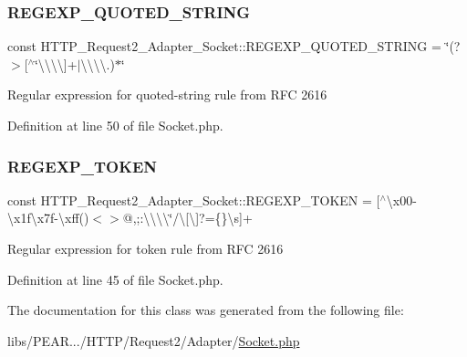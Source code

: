\subsubsection{\texorpdfstring{R\+E\+G\+E\+X\+P\+\_\+\+Q\+U\+O\+T\+E\+D\+\_\+\+S\+T\+R\+I\+NG}{REGEXP\_QUOTED\_STRING}}
{\footnotesize\ttfamily const H\+T\+T\+P\+\_\+\+Request2\+\_\+\+Adapter\+\_\+\+Socket\+::\+R\+E\+G\+E\+X\+P\+\_\+\+Q\+U\+O\+T\+E\+D\+\_\+\+S\+T\+R\+I\+NG = \textquotesingle{}\char`\"{}(?$>$\mbox{[}$^\wedge$\char`\"{}\textbackslash{}\textbackslash{}\textbackslash{}\textbackslash{}\mbox{]}+$\vert$\textbackslash{}\textbackslash{}\textbackslash{}\textbackslash{}.)$\ast$\char`\"{}\textquotesingle{}}

Regular expression for \textquotesingle{}quoted-\/string\textquotesingle{} rule from R\+FC 2616 

Definition at line 50 of file Socket.\+php.

\mbox{\label{classHTTP__Request2__Adapter__Socket_a56beacc9218c6048c7f9ad5af80959eb}} 
\subsubsection{\texorpdfstring{R\+E\+G\+E\+X\+P\+\_\+\+T\+O\+K\+EN}{REGEXP\_TOKEN}}
{\footnotesize\ttfamily const H\+T\+T\+P\+\_\+\+Request2\+\_\+\+Adapter\+\_\+\+Socket\+::\+R\+E\+G\+E\+X\+P\+\_\+\+T\+O\+K\+EN = \textquotesingle{}\mbox{[}$^\wedge$\textbackslash{}x00-\/\textbackslash{}x1f\textbackslash{}x7f-\/\textbackslash{}xff()$<$$>$@,;\+:\textbackslash{}\textbackslash{}\textbackslash{}\textbackslash{}\char`\"{}/\textbackslash{}\mbox{[}\textbackslash{}\mbox{]}?=\{\}\textbackslash{}s\mbox{]}+\textquotesingle{}}

Regular expression for \textquotesingle{}token\textquotesingle{} rule from R\+FC 2616 

Definition at line 45 of file Socket.\+php.



The documentation for this class was generated from the following file\+:\begin{DoxyCompactItemize}
\item 
libs/\+P\+E\+A\+R.../\+H\+T\+T\+P/\+Request2/\+Adapter/\hyperlink{Socket_8php}{Socket.\+php}\end{DoxyCompactItemize}
